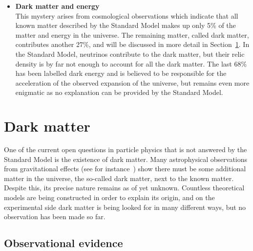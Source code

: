 \begin{itemize}
 \item[]\textbf{Dark matter and energy}\\
 This mystery arises from cosmological observations which indicate that all known matter described by the Standard Model makes up only 5\% of the matter and energy in the universe. The remaining matter, called dark matter, contributes another 27\%, and will be discussed in more detail in Section~\ref{sec:DM}. In the Standard Model, neutrinos contribute to the dark matter, but their relic density is by far not enough to account for all the dark matter. The last 68\% has been labelled dark energy and is believed to be responsible for the acceleration of the observed expansion of the universe, but remains even more enigmatic as no explanation can be provided by the Standard Model.
\end{itemize}

\section{Dark matter}
\label{sec:DM}

One of the current open questions in particle physics that is not answered by the Standard Model is the existence of dark matter. Many astrophysical observations from gravitational effects (see for instance~\cite{Bertone:2004pz}) show there must be some additional matter in the universe, the so-called dark matter, next to the known matter. Despite this, its precise nature remains as of yet unknown. Countless theoretical models are being constructed in order to explain its origin, and on the experimental side dark matter is being looked for in many different ways, but no observation has been made so far.

\subsection{Observational evidence}

